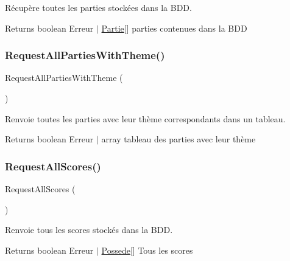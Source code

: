 Récupère toutes les parties stockées dans la B\+DD. 

\begin{DoxyReturn}{Returns}
boolean Erreur $\vert$ \mbox{\hyperlink{class_partie}{Partie}}\mbox{[}\mbox{]} parties contenues dans la B\+DD 
\end{DoxyReturn}
\mbox{\label{class_interface_b_d_d_a9d671df2428c378fcb683f587e2a62d5}} 
\subsubsection{\texorpdfstring{Request\+All\+Parties\+With\+Theme()}{RequestAllPartiesWithTheme()}}
{\footnotesize\ttfamily Request\+All\+Parties\+With\+Theme (\begin{DoxyParamCaption}{ }\end{DoxyParamCaption})}



Renvoie toutes les parties avec leur thème correspondants dans un tableau. 

\begin{DoxyReturn}{Returns}
boolean Erreur $\vert$ array tableau des parties avec leur thème 
\end{DoxyReturn}
\mbox{\label{class_interface_b_d_d_a4d1d3a0c3fed3edec5e93a039e5cc15a}} 
\subsubsection{\texorpdfstring{Request\+All\+Scores()}{RequestAllScores()}}
{\footnotesize\ttfamily Request\+All\+Scores (\begin{DoxyParamCaption}{ }\end{DoxyParamCaption})}



Renvoie tous les scores stockés dans la B\+DD. 

\begin{DoxyReturn}{Returns}
boolean Erreur $\vert$ \mbox{\hyperlink{class_possede}{Possede}}\mbox{[}\mbox{]} Tous les scores 
\end{DoxyReturn}
\mbox{\label{class_interface_b_d_d_aaadfadb8a0a987f3d7a82dc3207e80f6}} 
